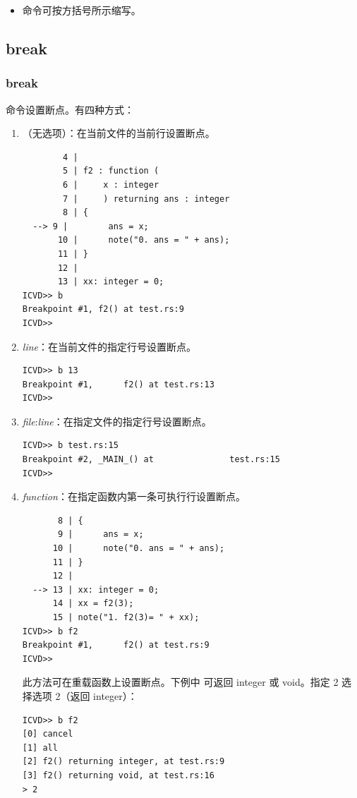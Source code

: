 {\footnotesize
\begin{itemize}[leftmargin=1.5em,nosep]
  \item[$^{a}$] 命令可按方括号所示缩写。
\end{itemize}
}

\subsection{break}
\subsubsection*{break}

 命令设置断点。有四种方式：

\begin{enumerate}
  \item {}（无选项）：在当前文件的当前行设置断点。
\begin{lstlisting}
        4 |
        5 | f2 : function (
        6 |     x : integer
        7 |     ) returning ans : integer
        8 | {
  --> 9 |        ans = x;
       10 |      note("0. ans = " + ans);
       11 | }
       12 |
       13 | xx: integer = 0;
ICVD>> b
Breakpoint #1, f2() at test.rs:9
ICVD>>
\end{lstlisting}

  \item {} \textit{line}：在当前文件的指定行号设置断点。
\begin{lstlisting}
ICVD>> b 13
Breakpoint #1,      f2() at test.rs:13
ICVD>>
\end{lstlisting}

  \item {} \textit{file}:\textit{line}：在指定文件的指定行号设置断点。
\begin{lstlisting}
ICVD>> b test.rs:15
Breakpoint #2, _MAIN_() at               test.rs:15
ICVD>>
\end{lstlisting}

  \item {} \textit{function}：在指定函数内第一条可执行行设置断点。
\begin{lstlisting}
       8 | {
       9 |      ans = x;
      10 |      note("0. ans = " + ans);
      11 | }
      12 |
  --> 13 | xx: integer = 0;
      14 | xx = f2(3);
      15 | note("1. f2(3)= " + xx);
ICVD>> b f2
Breakpoint #1,      f2() at test.rs:9
ICVD>>
\end{lstlisting}

此方法可在重载函数上设置断点。下例中  可返回 integer 或 void。指定 2 选择选项 2（返回 integer）：
\begin{lstlisting}
ICVD>> b f2
[0] cancel
[1] all
[2] f2() returning integer, at test.rs:9
[3] f2() returning void, at test.rs:16
> 2
\end{lstlisting}


\end{enumerate}
